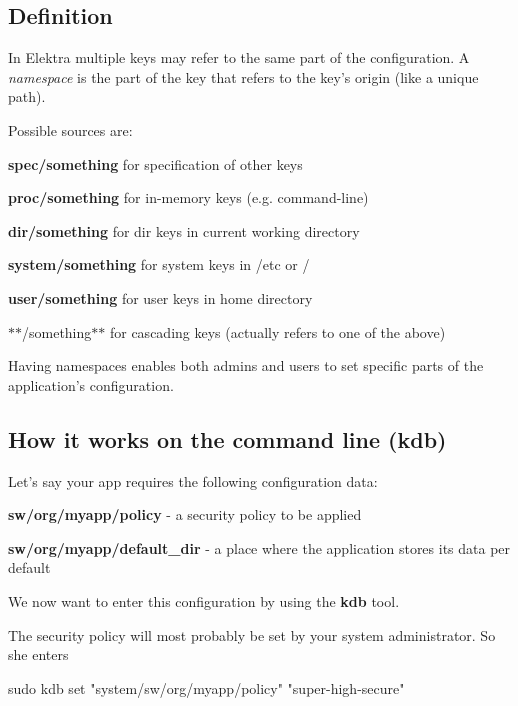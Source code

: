 \subsection*{Definition}

In Elektra multiple keys may refer to the same part of the configuration. A {\itshape namespace} is the part of the key that refers to the key's origin (like a unique path).

Possible sources are\+:


\begin{DoxyItemize}
\item {\bfseries spec/something} for specification of other keys
\item {\bfseries proc/something} for in-\/memory keys (e.\+g. command-\/line)
\item {\bfseries dir/something} for dir keys in current working directory
\item {\bfseries system/something} for system keys in /etc or /
\item {\bfseries user/something} for user keys in home directory
\item $\ast$$\ast$/something$\ast$$\ast$ for cascading keys (actually refers to one of the above)
\end{DoxyItemize}

Having namespaces enables both admins and users to set specific parts of the application's configuration.

\subsection*{How it works on the command line (kdb)}

Let's say your app requires the following configuration data\+:


\begin{DoxyItemize}
\item {\bfseries sw/org/myapp/policy} -\/ a security policy to be applied
\item {\bfseries sw/org/myapp/default\+\_\+dir} -\/ a place where the application stores its data per default
\end{DoxyItemize}

We now want to enter this configuration by using the {\bfseries kdb} tool.

The security policy will most probably be set by your system administrator. So she enters \begin{DoxyVerb}    sudo kdb set "system/sw/org/myapp/policy" "super-high-secure"
\end{DoxyVerb}



